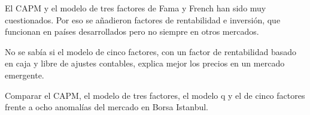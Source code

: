 \documentclass{article}
\newcommand{\bodysize}{\fontsize{29}{38.3}\selectfont}
\newcommand{\cardtitlesize}{\fontsize{34.2}{41.0}\selectfont}
\newcommand{\smallsize}{\fontsize{23.8}{30.9}\selectfont}
\newcommand{\cardtitle}[2][navy]{{\color{#1}\cardtitlesize\bfseries\textls[110]{\MakeUppercase{#2}}}\par\vspace{7mm}}
\begin{document}
\vfill
\hspace*{34mm}\begin{minipage}{773mm}
\begin{tcolorbox}[enhanced, sharp corners, colback=navy, boxrule=0pt, left=16mm, right=16mm, top=12mm, bottom=11mm,
  fontupper=\bodysize\raggedright, overlay={\fill[gold] (frame.north west) rectangle ([yshift=-5mm]frame.north east);}]
\begin{minipage}[t]{174.8mm}\raggedright{\color{acento}\smallsize\bfseries{}}\par{}\end{minipage}\hfill\begin{minipage}[t]{174.8mm}\raggedright{\color{acento}\smallsize\bfseries{}}\par{}\end{minipage}\hfill\begin{minipage}[t]{174.8mm}\raggedright{\color{acento}\smallsize\bfseries{}}\par{}\end{minipage}\hfill\begin{minipage}[t]{174.8mm}\raggedright{\color{acento}\smallsize\bfseries{}}\par{}\end{minipage}
\end{tcolorbox}
\end{minipage}

\vfill
\hspace*{34mm}\begin{minipage}{773mm}
\begin{tcbraster}[raster columns=3, raster equal height, raster column skip=16mm]
\begin{tcolorbox}[card]\cardtitle{Contexto}El CAPM y el modelo de tres factores de Fama y French han sido muy cuestionados. Por eso se añadieron factores de rentabilidad e inversión, que funcionan en países desarrollados pero no siempre en otros mercados.\end{tcolorbox}
\begin{tcolorbox}[card]\cardtitle{Problema}No se sabía si el modelo de cinco factores, con un factor de rentabilidad basado en caja y libre de ajustes contables, explica mejor los precios en un mercado emergente.\end{tcolorbox}
\begin{tcolorbox}[card]\cardtitle{Objetivo}Comparar el CAPM, el modelo de tres factores, el modelo q y el de cinco factores frente a ocho anomalías del mercado en Borsa Istanbul.\end{tcolorbox}
\end{tcbraster}
\end{minipage}
\end{document}
